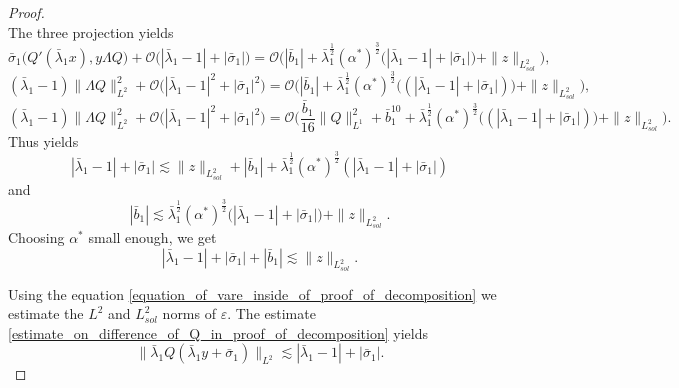 \documentclass[16pt,english, oneside,reqno]{smfart}
\newcommand{\vare}{{\varepsilon}}
\begin{document}
\begin{proof}
\begin{equation}
\end{equation}
The three projection yields
\begin{equation}
    \bar{\sigma}_1\big( Q'(\bar{\lambda}_1 x), y \Lambda Q\big) + \mathcal{O}\big( |\bar{\lambda}_1 -1| + |\bar{\sigma}_1| \big) = \mathcal{O}\big(|\bar{b}_1| + \bar{\lambda}_1^{\frac{1}{2}}(\alpha^*)^{\frac{3}{2}}\big( |\bar{\lambda}_1-1| + |\bar{\sigma}_1| \big) + \|z\|_{L^2_{sol}} \big),
\end{equation}
\begin{equation}
    (\bar{\lambda}_1-1)\|\Lambda Q\|^2_{L^2} + \mathcal{O}\big( |\bar{\lambda}_1 -1|^2 + |\bar{\sigma}_1|^2 \big) = \mathcal{O}\big(|\bar{b}_1| + \bar{\lambda}_1^{\frac{1}{2}}(\alpha^*)^{\frac{3}{2}}\big((|\bar{\lambda}_1 -1|+|\bar{\sigma}_1| ) \big) + \|z\|_{L^2_{sol}} \big),
\end{equation}
\begin{equation}
    (\bar{\lambda}_1-1)\|\Lambda Q\|^2_{L^2} + \mathcal{O}\big( |\bar{\lambda}_1 -1|^2 + |\bar{\sigma}_1|^2 \big) = \mathcal{O}\big(\frac{\bar{b}_1}{16}\|Q\|^2_{L^1} + \bar{b}_1^{10} + \bar{\lambda}_1^{\frac{1}{2}}(\alpha^*)^{\frac{3}{2}}\big((|\bar{\lambda}_1 -1|+|\bar{\sigma}_1| ) \big) + \|z\|_{L^2_{sol}} \big).
\end{equation}
Thus yields
\begin{equation}
    |\bar{\lambda}_1 -1| + |\bar{\sigma}_1| \lesssim \|z\|_{L^2_{sol}} + |\bar{b}_1| + \bar{\lambda}_1^{\frac{1}{2}}(\alpha^*)^{\frac{3}{2}}(|\bar{\lambda}_1 -1| + |\bar{\sigma}_1|)
\end{equation}
and
\begin{equation}
    |\bar{b}_1| \lesssim \bar{\lambda}_1^{\frac{1}{2}}(\alpha^*)^{\frac{3}{2}}\big( |\bar{\lambda}_1 -1| + |\bar{\sigma}_1 | \big) + \| z\|_{L^2_{sol}}.
\end{equation}
Choosing $\alpha^*$ small enough, we get
\begin{equation}\label{estimate_on_lambda_sigma_b_in_proof_of_decomp_second_part}
    |\bar{\lambda}_1 -1| + |\bar{\sigma}_1| + |\bar{b}_1| \lesssim \|z\|_{L^2_{sol}}.
\end{equation}

Using the equation \eqref{equation_of_vare_inside_of_proof_of_decomposition} we estimate the $L^2$ and $L^2_{sol}$ norms of $\vare$. 
The estimate \eqref{estimate_on_difference_of_Q_in_proof_of_decomposition} yields 
\begin{equation}
    \|\bar{\lambda}_1 Q(\bar{\lambda}_1 y +\bar{\sigma}_1)\|_{L^2} \lesssim |\bar{\lambda}_1 - 1| + |\bar{\sigma}_1|.
\end{equation}


\end{proof}
\end{document}
